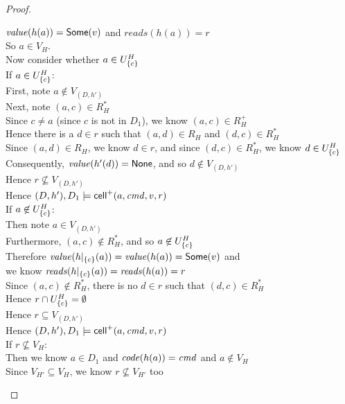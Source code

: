 \begin{proof}
\begin{tabbedproof}
       $\mathit{value}(h(a)) = \mathsf{Some}(v)$ and $\mathit{reads}(h(a)) = r$ \\
\ooooo So $a \in V_H$. \\
\ooooo Now consider whether $a \in U^H_{\{{c}\}}$ \\
\ooooo If $a \in U^H_{\{{c}\}}$: \\
\oooooo First, note $a \not\in V_{(D,h')}$ \\
\oooooo Next, note $(a, c) \in R^*_H$ \\
\oooooo Since $c \not= a$ (since $c$ is not in $D_1$), we know $(a, c) \in R^+_H$ \\
\oooooo Hence there is a $d \in r$ such that $(a,d) \in R_H$ and $(d, c) \in R^*_H$  \\
\oooooo Since $(a,d) \in R_H$, we know $d \in r$, and since $(d, c) \in R^*_H$, we know $d \in U^H_{\{{c}\}}$ \\
\oooooo Consequently, $\mathit{value}(h'(d)) = \mathsf{None}$, and so $d \not\in V_{(D,h')}$\\
\oooooo Hence $r \not\subseteq V_{(D, h')}$ \\
\oooooo Hence $(D,h'), D_1 \models \mathsf{cell}^{+}({a}, {\mathit{cmd}}, {v}, {r})$ \\
\ooooo If $a \not\in U^H_{\{{c}\}}$: \\
\oooooo Then note $a \in V_{(D,h')}$ \\
\oooooo Furthermore, $(a, c) \not\in R^*_H$, and so $a \not\in U^H_{\{{c}\}}$ \\
\oooooo Therefore $\mathit{value}(h|_{\{{c}\}}(a)) = \mathit{value}(h(a)) = \mathsf{Some}(v)$ and \\
\oooooo we know $\mathit{reads}(h|_{\{{c}\}}(a)) = \mathit{reads}(h(a)) = r$ \\
\oooooo Since $(a, c) \not\in R^*_H$, there is no $d \in r$ such that $(d, c) \in R^*_H$  \\
\oooooo Hence $r \cap U^H_{\{{c}\}} = \emptyset$ \\
\oooooo Hence $r \subseteq V_{(D,h')}$ \\
\oooooo Hence $(D,h'), D_1 \models \mathsf{cell}^{+}({a}, {\mathit{cmd}}, {v}, {r})$ \\
\oooo If $r \not\subseteq V_H$: \\
\ooooo Then we know $a \in D_1$ and $\mathit{code}(h(a)) = \mathit{cmd}$ and $a \not\in V_H$  \\
\ooooo Since $V_{H'} \subseteq V_H$, we know $r \not\subseteq V_{H'}$ too \\

\end{tabbedproof}
\end{proof}
